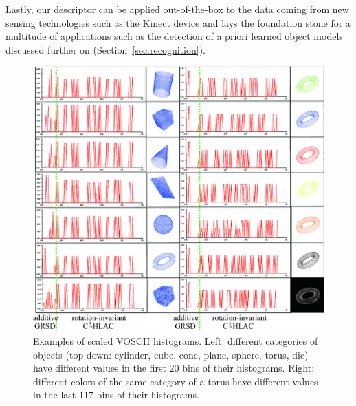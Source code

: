\documentclass[letterpaper, 10 pt, conference]{sty/ieeeconf}
\begin{document}
Lastly, our descriptor can be applied out-of-the-box to the data coming from 
new sensing technologies such as the Kinect device and lays the foundation stone for a
multitude of applications  such as the detection of a priori learned object models discussed
further on (Section~\ref{sec:recognition}).

\begin{figure}[tb!]
  \begin{center}
    \includegraphics[width=.99\columnwidth]{figures/colorCHLAC/artificial/normalized_hist.jpg}
    \caption{Examples of scaled VOSCH histograms.
Left: different categories of objects (top-down: cylinder, cube, cone, plane, sphere, torus, die) 
have different values in the first 20 bins of their histograms.
Right: different colors of the same category of a torus have different values in the last 117 bins of their histograms.}
    \label{fig:grsd_cchlac}
  \end{center}
\end{figure}
\end{document}
